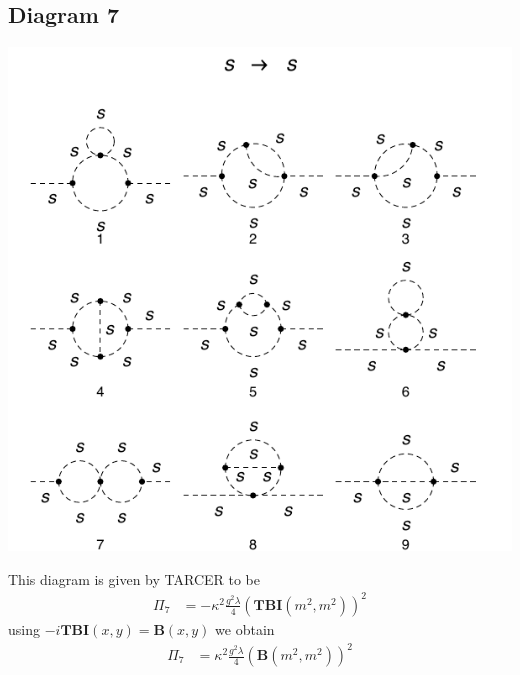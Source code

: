 \documentclass[11pt]{article}
\newcommand{\tarcer}{\textsf{TARCER} }
\begin{document}
\subsection*{Diagram 7}
\noindent\begin{minipage}{0.3\textwidth}
\begin{center}
\includegraphics{2loop_7.pdf}
\end{center}
\end{minipage}
\noindent\begin{minipage}{0.7\textwidth}
This diagram is given by \tarcer to be
\begin{align}
\Pi_7 & =  -\kappa^2 \frac{g^2 \lambda}{4 } \left(\mathbf{TBI}(m^2,m^2)\right)^2
\end{align}
using $-i\mathbf{TBI}(x,y) = \mathbf{B}(x,y)$ we obtain
\begin{align}
\Pi_7 & = \kappa^2 \frac{g^2 \lambda}{4 } \left(\mathbf{B}(m^2,m^2)\right)^2
\end{align}
\end{minipage}
\end{document}
